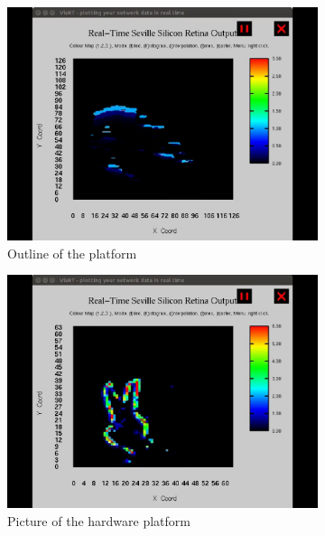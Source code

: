 \begin{figure}
\centering
	\begin{subfigure}[t]{0.42\textwidth}
		\includegraphics[width=\textwidth]{pics/live1.png}
	    \caption{Outline of the platform}
	    \label{fig:live1}
	\end{subfigure}
	\begin{subfigure}[t]{0.42\textwidth}
		\includegraphics[width=\textwidth]{pics/live2.png}
		\caption{Picture of the hardware platform}
	    \label{fig:live2}
	\end{subfigure}
	\\
	\begin{subfigure}[t]{0.84\textwidth}

\end{subfigure}
\end{figure}
